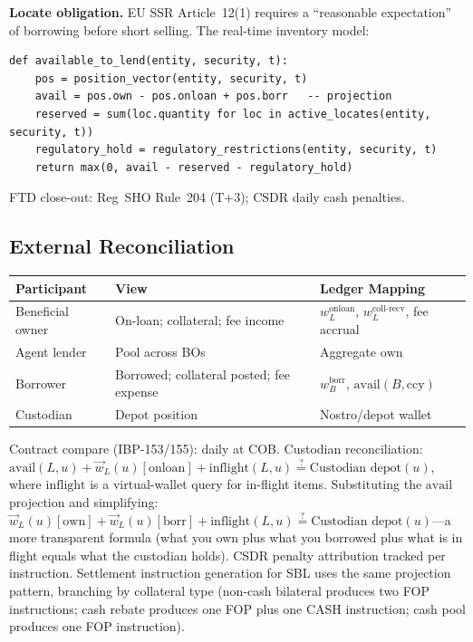 \documentclass[11pt,a4paper]{article}
\begin{document}
\medskip
\noindent\textbf{Locate obligation.} EU SSR Article~12(1) requires a ``reasonable expectation'' of borrowing before short selling. The real-time inventory model:
\begin{lstlisting}
def available_to_lend(entity, security, t):
    pos = position_vector(entity, security, t)
    avail = pos.own - pos.onloan + pos.borr   -- projection
    reserved = sum(loc.quantity for loc in active_locates(entity, security, t))
    regulatory_hold = regulatory_restrictions(entity, security, t)
    return max(0, avail - reserved - regulatory_hold)
\end{lstlisting}

FTD close-out: Reg~SHO Rule~204 (T+3); CSDR daily cash penalties.

\subsection{External Reconciliation}
\label{sec:sbl-external}

\begin{center}
\small
\begin{tabular}{l p{4.5cm} p{3.5cm}}
\toprule
\textbf{Participant} & \textbf{View} & \textbf{Ledger Mapping} \\
\midrule
Beneficial owner & On-loan; collateral; fee income & $w^{\mathrm{onloan}}_L$, $w^{\mathrm{coll\text{-}recv}}_L$, fee accrual \\
Agent lender & Pool across BOs & Aggregate $\mathrm{own}$ \\
Borrower & Borrowed; collateral posted; fee expense & $w^{\mathrm{borr}}_B$, $\mathrm{avail}(B, \mathrm{ccy})$ \\
Custodian & Depot position & Nostro/depot wallet \\
\bottomrule
\end{tabular}
\end{center}

Contract compare (IBP-153/155): daily at COB. Custodian reconciliation: $\mathrm{avail}(L,u) + \vec{w}_L(u)[\mathrm{onloan}] + \mathrm{inflight}(L,u) \stackrel{?}{=} \text{Custodian depot}(u)$, where $\mathrm{inflight}$ is a virtual-wallet query for in-flight items. Substituting the $\mathrm{avail}$ projection and simplifying: $\vec{w}_L(u)[\mathrm{own}] + \vec{w}_L(u)[\mathrm{borr}] + \mathrm{inflight}(L,u) \stackrel{?}{=} \text{Custodian depot}(u)$---a more transparent formula (what you own plus what you borrowed plus what is in flight equals what the custodian holds). CSDR penalty attribution tracked per instruction. Settlement instruction generation for SBL uses the same projection pattern, branching by collateral type (non-cash bilateral produces two FOP instructions; cash rebate produces one FOP plus one CASH instruction; cash pool produces one FOP instruction).
\end{document}
